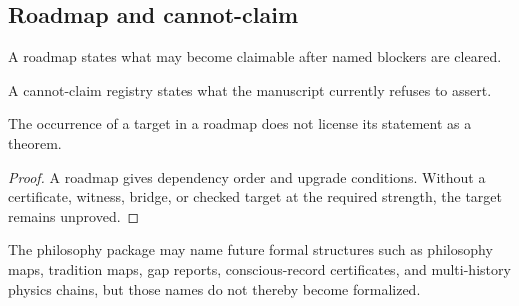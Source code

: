 \subsection{Roadmap and cannot-claim}
\label{subsec:philosophy-programme-roadmap-cannot-claim}

\begin{definition}[Roadmap]
\label{def:philosophy-programme-roadmap}
A roadmap states what may become claimable after named blockers are
cleared.
\end{definition}

\begin{definition}
\label{def:philosophy-programme-cannot-claim-registry}
A cannot-claim registry states what the manuscript currently refuses
to assert.
\end{definition}

\begin{theorem}
\label{thm:philosophy-programme-roadmap-not-theorem}
The occurrence of a target in a roadmap does not license its statement
as a theorem.
\end{theorem}
\begin{proof}
A roadmap gives dependency order and upgrade conditions. Without a
certificate, witness, bridge, or checked target at the required
strength, the target remains unproved.
\end{proof}

\begin{corollary}
\label{cor:philosophy-programme-roadmap-use}
The philosophy package may name future formal structures such as
philosophy maps, tradition maps, gap reports, conscious-record
certificates, and multi-history physics chains, but those names do not
thereby become formalized.
\end{corollary}
